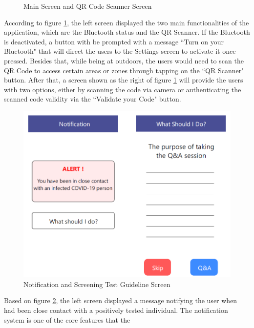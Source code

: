 \begin{enumerate}[a)]
\begin{figure}[H]
            \caption{Main Screen and QR Code Scanner Screen}
            \label{fig:iter3-proto-1}
          \end{figure}
          \par According to figure \ref{fig:iter3-proto-1}, the left screen displayed the two main functionalities of the application, which
          are the Bluetooth status and the QR Scanner. If the Bluetooth is deactivated, a button with be
          prompted with a message ``Turn on your Bluetooth" that will direct the users to the Settings screen to
          activate it once pressed. Besides that, while being at outdoors, the users would need to scan the QR
          Code to access certain areas or zones through tapping on the ``QR Scanner" button. After that, a screen
          shown as the right of figure \ref{fig:iter3-proto-1} will provide the users with two options, either by scanning the code via
          camera or authenticating the scanned code validity via the ``Validate your Code" button.
          \begin{figure}[H]
            \centering
            \includegraphics[scale=1]{img/prototype/iter3-proto-2.png}
            \caption{Notification and Screening Test Guideline Screen}
            \label{fig:iter3-proto-2}
          \end{figure}
          \par Based on figure \ref{fig:iter3-proto-2}, the left screen displayed a message notifying the user when had been close contact
          with a positively tested individual. The notification system is one of the core features that the

\end{enumerate}
